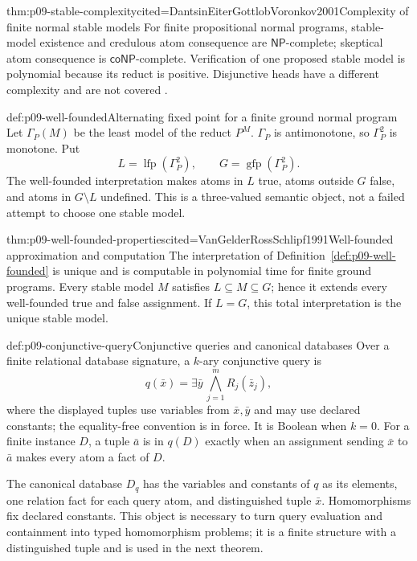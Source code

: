 \begin{hbtheorem}{thm:p09-stable-complexity}{cited=DantsinEiterGottlobVoronkov2001}{Complexity of finite normal stable models}
For finite propositional normal programs, stable-model existence and credulous
atom consequence are \(\mathsf{NP}\)-complete; skeptical atom consequence is
\(\mathsf{coNP}\)-complete.  Verification of one proposed stable model is
polynomial because its reduct is positive.  Disjunctive heads have a different
complexity and are not covered \cite{MarekTruszczynski1999}.
\end{hbtheorem}

\begin{hbdefinition}{def:p09-well-founded}{Alternating fixed point for a finite ground normal program}
Let \(\Gamma_P(M)\) be the least model of the reduct \(P^M\).
\(\Gamma_P\) is antimonotone, so \(\Gamma_P^2\) is monotone.  Put
\[
 L=\operatorname{lfp}(\Gamma_P^2),
 \qquad
 G=\operatorname{gfp}(\Gamma_P^2).
\]
The well-founded interpretation makes atoms in \(L\) true, atoms outside
\(G\) false, and atoms in \(G\setminus L\) undefined.  This is a
three-valued semantic object, not a failed attempt to choose one stable model.
\end{hbdefinition}

\begin{hbtheorem}{thm:p09-well-founded-properties}{cited=VanGelderRossSchlipf1991}{Well-founded approximation and computation}
The interpretation of Definition~\ref{def:p09-well-founded} is unique and is
computable in polynomial time for finite ground programs.  Every stable model
\(M\) satisfies \(L\subseteq M\subseteq G\); hence it extends every
well-founded true and false assignment.  If \(L=G\), this total interpretation
is the unique stable model.
\end{hbtheorem}

\begin{hbdefinition}{def:p09-conjunctive-query}{Conjunctive queries and canonical databases}
Over a finite relational database signature, a \(k\)-ary conjunctive query is
\[
 q(\bar x)=\exists\bar y\,
   \bigwedge_{j=1}^{m}R_j(\bar z_j),
\]
where the displayed tuples use variables from \(\bar x,\bar y\) and may use
declared constants; the equality-free convention is in force.  It is Boolean
when \(k=0\).  For a finite instance \(D\), a tuple \(\bar a\) is in \(q(D)\)
exactly when an assignment sending \(\bar x\) to \(\bar a\) makes every atom a
fact of \(D\).

The canonical database \(D_q\) has the variables and constants of \(q\) as its
elements, one relation fact for each query atom, and distinguished tuple
\(\bar x\).  Homomorphisms fix declared constants.  This object is necessary
to turn query evaluation and containment into typed homomorphism problems; it
is a finite structure with a distinguished tuple and is used in the next
theorem.
\end{hbdefinition}

